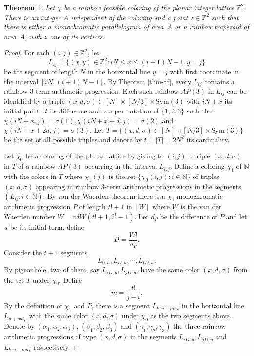 \documentclass[a4paper, 11pt,reqno]{amsart}
\newtheorem{theorem}{Theorem}
\theoremstyle{definition}
\newcommand{\N}{\mbox{${\mathbb N}$}}
\newcommand{\Z}{\mbox{${\mathbb Z}$}}
\begin{document}
\begin{theorem} \label{mono-rainbow}
Let $\chi$ be a rainbow feasible coloring of the planar integer lattice $\Z^2$. There is an integer $A$
independent of the coloring and a point $z\in \Z^2$ such that there is either a monochromatic parallelogram of area~$A$
or a rainbow trapezoid of area~$A$, with $z$ one of its vertices.
\end{theorem}

\begin{proof} For each $(i,j)\in \Z^2$, let
\[
L_{ij}=\{(x,y)\in \Z^2: iN\le x \le (i+1)N-1, y=j\}
\]
be the segment of length $N$ in the horizontal line $y=j$ with first coordinate in the interval $[iN,(i+1)N-1]$. By
Theorem \ref{thm-af}, every $L_{ij}$ contains a rainbow  $3$-term arithmetic progression.  Each such rainbow $AP(3)$
in $L_{ij}$  can be identified by a triple $(x,d,\sigma)\in [N]\times [N/3]\times \text{Sym}(3)$ with  $iN+x$ its initial
point, $d$  its difference and $\sigma$ a permutation of $\{1,2,3\}$ such that $\chi (iN+x,j)=\sigma(1),
\chi (iN+x+d,j)=\sigma(2)$ and $\chi(iN+x+2d,j)=\sigma (3)$. Let $T=\{(x,d,\sigma)\in [N]\times [N/3]\times \text{Sym}(3)\}$
be the set of all possible triples  and denote by  $t=|T|=2N^2$ its cardinality.

Let $\chi_0$ be a coloring of the planar lattice by giving to $(i,j)$ a triple $(x,d,\sigma)$ in $T$ of a rainbow $AP(3)$
occurring in the interval $L_{i,j}$.
Define a coloring $\chi_1$ of $\N$ with the colors in $T$ where $\chi_1(j)$ is the set $\{\chi_0(i,j): i\in \N\}$ of triples
$(x,d,\sigma)$ appearing in rainbow $3$-term arithmetic progressions  in the segments $(L_{ij}: i\in \N)$. By van der
Waerden theorem there is a $\chi_1$-monochromatic arithmetic progression $P$ of length $t!+1$ in $[W]$ where $W$ is the
van der Waerden number $W=vdW(t!+1, 2^t-1)$. Let $d_P$ be the difference of $P$ and let $u$ be its initial term. define
\[
D=\frac{W!}{d_P}.
\]
Consider the $t+1$ segments
\[
L_{0,u}, L_{D,u}, \cdots , L_{tD, u}.
\]
By pigeonhole, two of them, say $L_{iD,u}, L_{jD,u}$,  have the same color $(x,d,\sigma)$ from the set $T$ under $\chi_0$.
Define
\[
m=\frac{t!}{j-i}.
\]
By the definition of $\chi_1$ and $P$, there is a segment $L_{k,u+md_P}$ in the horizontal line $L_{u+md_P}$ with the same
color $(x,d,\sigma)$ under $\chi_0$ as the two segments above. Denote by $(\alpha_1,\alpha_2,\alpha_3)$,
$(\beta_1,\beta_2,\beta_3)$ and $(\gamma_1,\gamma_2,\gamma_3)$  the three rainbow arithmetic progressions of
type $(x,d,\sigma)$  in the segments $L_{iD,u}, L_{jD,u}$ and $L_{k,u+md_P}$ respectively.


\end{proof}
\end{document}
